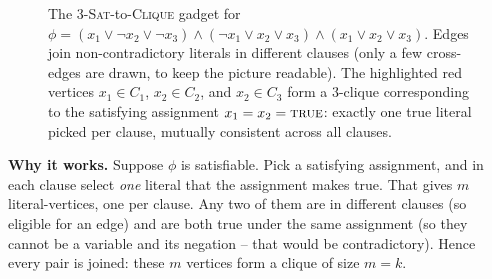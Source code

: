 \begin{figure}[h]
\centering
{}
\caption{The \textsc{3-Sat}-to-\textsc{Clique} gadget for $\phi=(x_1\vee\neg x_2
\vee\neg x_3)\wedge(\neg x_1\vee x_2\vee x_3)\wedge(x_1\vee x_2\vee x_3)$. Edges
join non-contradictory literals in different clauses (only a few cross-edges are
drawn, to keep the picture readable). The highlighted red vertices $x_1 \in C_1$,
$x_2 \in C_2$, and $x_2 \in C_3$ form a $3$-clique corresponding to the
satisfying assignment $x_1=x_2=\textsc{true}$: exactly one true literal picked
per clause, mutually consistent across all clauses.}
\label{ch33:clique-gadget}
\end{figure}

\textbf{Why it works.} Suppose $\phi$ is satisfiable. Pick a satisfying
assignment, and in each clause select \emph{one} literal that the assignment makes
true. That gives $m$ literal-vertices, one per clause. Any two of them are in
different clauses (so eligible for an edge) and are both true under the same
assignment (so they cannot be a variable and its negation -- that would be
contradictory). Hence every pair is joined: these $m$ vertices form a clique of
size $m=k$.

